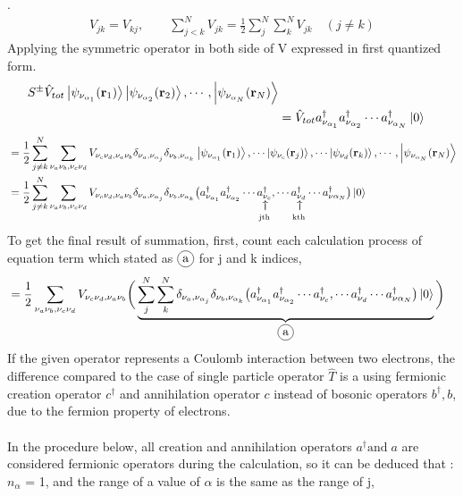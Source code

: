 \documentclass{article}
\makeatletter
\newcommand\vertarrowbox[2]{%
    \begin{array}[t]{@{}c@{}} #1 \\
    \rotatebox{90}{$\xrightarrow{\hphantom{a}}$} \\[-1ex]
    \mathclap{\scriptstyle\text{#2}}%
    \end{array}}
\newcommand\encircle[1]{%
    \tikz[baseline=(X.base)] 
      \node (X) [draw, shape=circle, inner sep=0] {\strut #1};}
\makeatother
\begin{document}
.
 \begin{align*}
    V_{jk}=V_{kj}, \qquad \sum^{N}_{j<k} V_{jk} = \frac{1}{2} \sum^{N}_{j}\sum^{N}_{k} V_{jk} \quad (j\neq k)
\end{align*}
Applying the symmetric operator in both side of V expressed in first quantized form.
\begin{align*}
    S^{\pm}\hat{V}_{tot}\ket{\psi_{\nu_{\alpha_1}}(\textbf{r}_1)}\ket{\psi_{\nu_{\alpha_2}}(\textbf{r}_2)},\cdots,\ket{\psi_{\nu_{\alpha_N}}(\textbf{r}_N)}\\
    &=\hat{V}_{tot} a^{\dagger}_{\nu_{\alpha_1}}a^{\dagger}_{\nu_{\alpha_2}}\cdots a^{\dagger}_{\nu_{\alpha_N}}\ket{0}
\end{align*}
\begin{align*}
    &=\frac{1}{2}\sum_{j\neq k}^{N}\sum_{\nu_a\nu_b,\nu_c \nu_d} V_{\nu_c\nu_d,\nu_a \nu_b}\delta_{\nu_a,\nu_{\alpha_j}}\delta_{\nu_b,\nu_{\alpha_k}}\ket{\psi_{\nu_{\alpha_1}}(\textbf{r}_1)},\cdots\ket{\psi_{\nu_{c}}(\textbf{r}_j)}, \cdots\ket{\psi_{\nu_{d}}(\textbf{r}_k)}, \cdots,\ket{\psi_{\nu_{\alpha_N}}(\textbf{r}_N)}\\
    &=\frac{1}{2}\sum_{j\neq k}^{N}\sum_{\nu_a\nu_b,\nu_c \nu_d} V_{\nu_c\nu_d,\nu_a \nu_b}
    \delta_{\nu_a,\nu_{\alpha_j}}\delta_{\nu_b,\nu_{\alpha_k}} \big( a^{\dagger}_{\nu_{\alpha_1}}a^{\dagger}_{\nu_{\alpha_2}}\cdots \vertarrowbox{a^{\dagger}_{\nu_c}}{\text{jth}}, \cdots \vertarrowbox{a^{\dagger}_{\nu_d}}{\text{kth}} \cdots a^{\dagger}_{\nu{\alpha_N}}\big)\ket{0} 
\end{align*}
To get the final result of summation, first, count each calculation process of equation term which stated as $\encircle{a}$ for j and k indices,
\begin{align*}
    &=\frac{1}{2}\sum_{\nu_a\nu_b,\nu_c \nu_d} V_{\nu_c\nu_d,\nu_a \nu_b} \bigg( \underbrace{\sum_{j}^{N}\sum_{k}^{N}
    \delta_{\nu_a,\nu_{\alpha_j}}\delta_{\nu_b,\nu_{\alpha_k}} {\big( a^{\dagger}_{\nu_{\alpha_1}}a^{\dagger}_{\nu_{\alpha_2}}\cdots a^{\dagger}_{\nu_c}, \cdots a^{\dagger}_{\nu_d} \cdots a^{\dagger}_{\nu{\alpha_N}}\big) \ket{0}}}_{\encircle{a}} \bigg)
\end{align*}
If the given operator represents a Coulomb interaction between two electrons, 
the difference compared to the case of single particle operator $\hat{T}$ is a using fermionic creation operator $c^{\dagger}$ and annihilation operator $c$ instead of bosonic operators ${b^{\dagger} , b}$, due to the fermion property of electrons.
\\ \\ In the procedure below, all creation and annihilation operators $a^{\dagger} \text{and} \; a$ are considered fermionic operators during the calculation, so it can be deduced that : $n_{\alpha}$ = 1, and the range of a value of $\alpha$ is the same as the range of j, 
\end{document}
